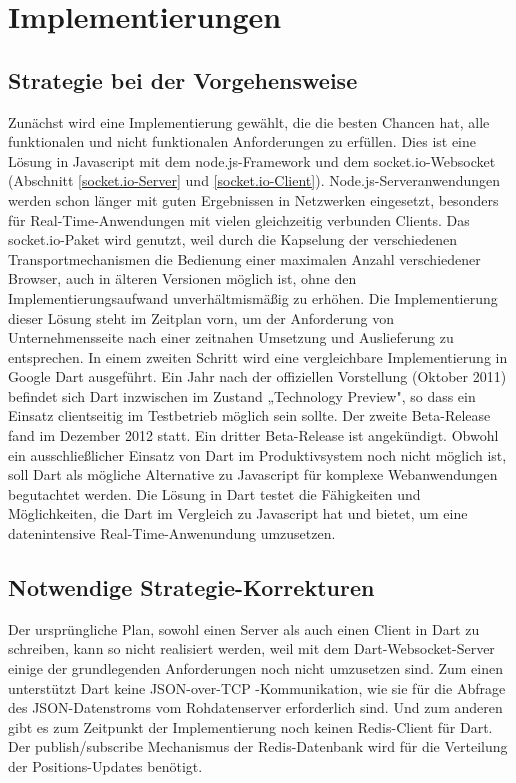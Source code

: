 
\chapter{Implementierungen}\label{s.Implementierungen}

\section{Strategie bei der Vorgehensweise}\label{Strategie bei der Vorgehensweise}
Zunächst wird eine Implementierung gewählt, die die besten Chancen hat, alle funktionalen und nicht funktionalen Anforderungen zu erfüllen. Dies ist eine Lösung in Javascript mit dem node.js-Framework und dem socket.io-Websocket (Abschnitt \ref{socket.io-Server} und \ref{socket.io-Client}). Node.js-Serveranwendungen werden schon länger mit guten Ergebnissen in Netzwerken eingesetzt, besonders für Real-Time-Anwendungen mit vielen gleichzeitig verbunden Clients. Das socket.io-Paket wird genutzt, weil durch die Kapselung der verschiedenen Transportmechanismen die Bedienung einer maximalen Anzahl verschiedener Browser, auch in älteren Versionen möglich ist, ohne den Implementierungsaufwand unverhältmismäßig zu erhöhen. Die Implementierung dieser Lösung steht im Zeitplan vorn, um der Anforderung von Unternehmensseite nach einer zeitnahen Umsetzung und Auslieferung zu entsprechen.
In einem zweiten Schritt wird eine vergleichbare Implementierung in Google Dart ausgeführt. Ein Jahr nach der offiziellen Vorstellung (Oktober 2011) befindet sich Dart inzwischen im Zustand
„Technology Preview", so dass ein Einsatz clientseitig im Testbetrieb möglich sein sollte. Der zweite Beta-Release fand im Dezember 2012 statt. Ein dritter Beta-Release ist angekündigt. Obwohl ein ausschließlicher Einsatz von Dart im Produktivsystem noch nicht möglich ist, soll Dart als mögliche Alternative zu Javascript für komplexe Webanwendungen begutachtet werden. Die Lösung in Dart testet die Fähigkeiten und Möglichkeiten, die Dart im Vergleich zu Javascript hat und bietet, um eine datenintensive Real-Time-Anwenundung umzusetzen.
\section{Notwendige Strategie-Korrekturen}\label{Strategie-Korrektur}
Der ursprüngliche Plan, sowohl einen Server als auch einen Client in Dart zu schreiben, kann so nicht realisiert werden, weil mit dem Dart-Websocket-Server einige der grundlegenden Anforderungen noch nicht umzusetzen sind. Zum einen unterstützt Dart keine JSON-over-TCP -Kommunikation, wie sie für die Abfrage des JSON-Datenstroms vom Rohdatenserver erforderlich sind. Und zum anderen gibt es zum Zeitpunkt der Implementierung noch keinen Redis-Client für Dart. Der publish/subscribe Mechanismus der Redis-Datenbank wird für die Verteilung der Positions-Updates benötigt.\\


